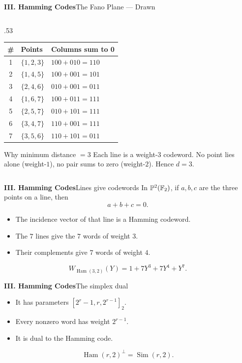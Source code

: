 \begin{frame}{\textbf{III. Hamming Codes}}{The Fano Plane — Drawn}
\begin{columns}[T,onlytextwidth]
\begin{column}{.53\textwidth}
    \begin{tabular}{c|l|l}
      \# & \textbf{Points} & \textbf{Columns sum to 0} \\\hline
      \rowcolor{TealDarkCyan!8}
      1 & $\{1,2,3\}$ & $100{+}010{=}110$ \\
      2 & $\{1,4,5\}$ & $100{+}001{=}101$ \\
      \rowcolor{TealDarkCyan!8}
      3 & $\{2,4,6\}$ & $010{+}001{=}011$ \\
      4 & $\{1,6,7\}$ & $100{+}011{=}111$ \\
      \rowcolor{TealDarkCyan!8}
      5 & $\{2,5,7\}$ & $010{+}101{=}111$ \\
      6 & $\{3,4,7\}$ & $110{+}001{=}111$ \\
      \rowcolor{TealDarkCyan!8}
      7 & $\{3,5,6\}$ & $110{+}101{=}011$ \\
    \end{tabular}

    \bigskip
    \begin{block}{Why minimum distance $= 3$}
    Each line is a weight-$3$ codeword. No point lies alone (weight-$1$), no pair sums to zero (weight-$2$). Hence $d = 3$.
    \end{block}
  \end{column}
\end{columns}
\end{frame}

\begin{frame}{\textbf{III. Hamming Codes}}{Lines give codewords}
\small
In $\mathbb{P}^2(\mathbb{F}_2)$, if $a,b,c$ are the three points on a line, then
\[
  a+b+c=0.
\]
\begin{itemize}
  \item The incidence vector of that line is a Hamming codeword.
  \item The $7$ lines give the $7$ words of weight $3$.
  \item Their complements give $7$ words of weight $4$.
\end{itemize}
\[
  W_{\operatorname{Ham}(3,2)}(Y)=1+7Y^3+7Y^4+Y^7.
\]
\end{frame}

\begin{frame}{\textbf{III. Hamming Codes}}{The simplex dual}
\small
{}
\begin{itemize}
  \item It has parameters $[2^r-1,r,2^{r-1}]_2$.
  \item Every nonzero word has weight $2^{r-1}$.
  \item It is dual to the Hamming code.
\end{itemize}
\[
  \operatorname{Ham}(r,2)^\perp=\operatorname{Sim}(r,2).
\]
\end{frame}

